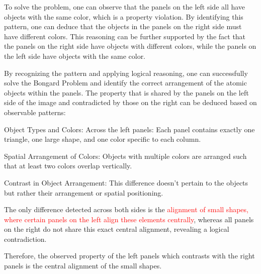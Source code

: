 \begin{tcolorbox}[breakable,enhanced jigsaw,opacityback=0,]
\begin{dialogue}
		To solve the problem, one can observe that the panels on the left side all have objects with the same color, which is a property violation. By identifying this pattern, one can deduce that the objects in the panels on the right side must have different colors. This reasoning can be further supported by the fact that the panels on the right side have objects with different colors, while the panels on the left side have objects with the same color.
		
		By recognizing the pattern and applying logical reasoning, one can successfully solve the Bongard Problem and identify the correct arrangement of the atomic objects within the panels.
		\vspace{1em}
		 The property that is shared by the panels on the left side of the image and contradicted by those on the right can be deduced based on observable patterns:
		
		Object Types and Colors: Across the left panels:
		Each panel contains exactly one triangle, one large shape, and one color specific to each column.
		
		Spatial Arrangement of Colors:
		Objects with multiple colors are arranged such that at least two colors overlap vertically.
		
		Contrast in Object Arrangement: This difference doesn’t pertain to the objects but rather their arrangement or spatial positioning.
		
		The only difference detected across both sides is the \textcolor{red}{alignment of small shapes, where certain panels on the left align these elements centrally}, whereas all panels on the right do not share this exact central alignment, revealing a logical contradiction.
		
		Therefore, the observed property of the left panels which contrasts with the right panels is the central alignment of the small shapes.
	\end{dialogue}
	\label{fig:task14-bongard}
\end{tcolorbox}




